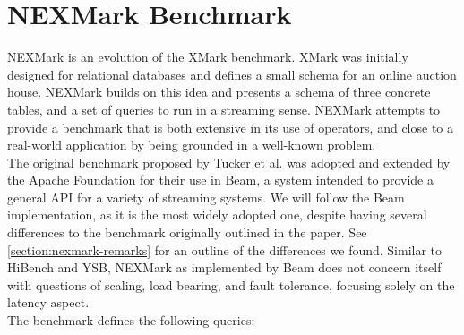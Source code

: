 \section{NEXMark Benchmark}
NEXMark\cite{nexmark} is an evolution of the XMark benchmark. XMark was initially designed for relational databases and defines a small schema for an online auction house. NEXMark builds on this idea and presents a schema of three concrete tables, and a set of queries to run in a streaming sense. NEXMark attempts to provide a benchmark that is both extensive in its use of operators, and close to a real-world application by being grounded in a well-known problem. \\

The original benchmark proposed by Tucker et al. was adopted and extended by the Apache Foundation for their use in Beam\cite{nexmark-beam}, a system intended to provide a general API for a variety of streaming systems. We will follow the Beam implementation, as it is the most widely adopted one, despite having several differences to the benchmark originally outlined in the paper. See \autoref{section:nexmark-remarks} for an outline of the differences we found. Similar to HiBench and YSB, NEXMark as implemented by Beam does not concern itself with questions of scaling, load bearing, and fault tolerance, focusing solely on the latency aspect. \\

The benchmark defines the following queries:

